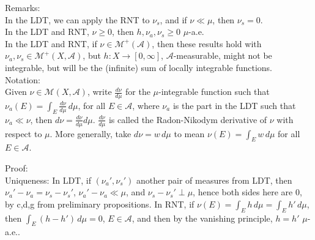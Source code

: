 \documentclass[12pt]{article}
\newcommand{\rarw}[0] { \rightarrow }
\newcommand{\A}[0] { \mathcal{A} }
\newcommand{\M}[0] { \mathcal{M} }
\begin{document}
\vspace{10pt}

\noindent
Remarks:  \\

\noindent
In the LDT, we can apply the RNT to $\nu_s$, and if $\nu \ll \mu$, then $\nu_s = 0$. \\

\noindent
In the LDT and RNT, $\nu \ge 0$, then $h, \nu_a, \nu_s \ge 0$ $\mu$-a.e. \\

\noindent
In the LDT and RNT, if $\nu \in \M^+(\A)$, then these results hold with $\nu_a, \nu_s \in \M^+(X, \A)$, but  $h: X \rarw [0, \infty]$, $\A$-measurable, might not be integrable, but will be the (infinite) sum of locally integrable functions. \\

\noindent
Notation: \\


\noindent
Given $\nu \in \M(X, \A)$, write $\frac{d\nu}{d\mu}$ for the $\mu$-integrable function such that $\nu_a(E) = \int_E \frac{d\nu}{d\mu} \, d\mu$, for all $E \in \A$, where $\nu_a$ is the part in the LDT such that $\nu_a \ll \nu$, then $d\nu =\frac{d\nu}{d\mu} d\mu$. $\frac{d\nu}{d\mu}$ is called the Radon-Nikodym derivative of $\nu$ with respect to $\mu$. More generally, take $d\nu = w \, d\mu$ to mean $\nu(E) = \int_E w \, d\mu$ for all $E \in \A$. \\







\vspace{10pt}


\noindent
Proof: \\

\noindent
Uniqueness: In LDT, if $(\nu_a', \nu_s')$ another pair of measures from LDT, then $\nu_a' - \nu_a = \nu_s - \nu_s'$, $\nu_a' - \nu_a \ll \mu$, and $\nu_s - \nu_s' \perp \mu$, hence both sides here are 0, by c,d,g from preliminary propositions. In RNT, if $ \nu(E) = \int_E h \, d\mu =  \int_E h' \, d\mu $, then $  \int_E (h - h') \, d\mu = 0$, $E \in \A$, and then by the vanishing principle, $h = h'$ $\mu$-a.e.. \\
\end{document}
